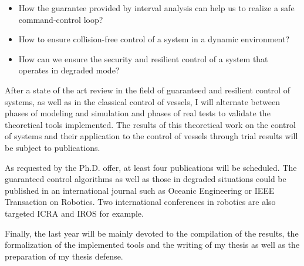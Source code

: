 \documentclass[11pt, a4paper]{awesome-cv}
\begin{document}
\begin{cvletter}
			\begin{itemize}[noitemsep,topsep=0pt,parsep=0pt,partopsep=0pt]
				\item How the guarantee provided by interval analysis can help us to realize a safe command-control loop?
				\item How to ensure collision-free control of a system in a dynamic environment?
				\item How can we ensure the security and resilient control of a system that operates in degraded mode?
			\end{itemize}

		

			After a state of the art review in the field of guaranteed and resilient control of systems, as well as in the classical control of vessels, I will alternate between phases of modeling and simulation and phases of real tests to validate the theoretical tools implemented. The results of this theoretical work on the control of systems and their application to the control of vessels through trial results will be subject to publications.
			
			As requested by the Ph.D. offer, at least four publications will be scheduled. The guaranteed control algorithms as well as those in degraded situations could be published in an international journal such as Oceanic Engineering or IEEE Transaction on Robotics. Two international conferences in robotics are also targeted \textsc{ICRA} and \textsc{IROS} for example.

			Finally, the last year will be mainly devoted to the compilation of the results, the formalization of the implemented tools and the writing of my thesis as well as the preparation of my thesis defense.

\end{cvletter}
\end{document}
